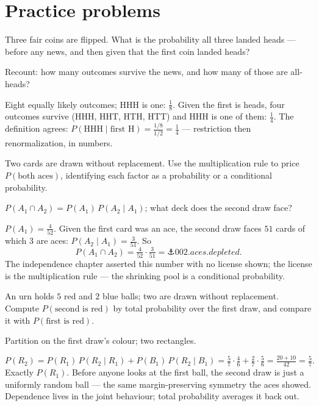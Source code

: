 \section*{Practice problems}

\begin{problem}
Three fair coins are flipped. What is the probability all three landed
heads — before any news, and then given that the first coin landed
heads?
\begin{hint}
Recount: how many outcomes survive the news, and how many of those are
all-heads?
\end{hint}
\begin{solution}
Eight equally likely outcomes; HHH is one: $\tfrac18$. Given the first
is heads, four outcomes survive (HHH, HHT, HTH, HTT) and HHH is one of
them: $\tfrac14$. The definition agrees:
$P(\mathrm{HHH} \mid \text{first H}) = \tfrac{1/8}{1/2} = \tfrac14$ —
restriction then renormalization, in numbers.
\end{solution}
\end{problem}

\begin{problem}
Two cards are drawn without replacement. Use the multiplication rule to
price $P(\text{both aces})$, identifying each factor as a probability
or a conditional probability.
\begin{hint}
$P(A_1 \cap A_2) = P(A_1)\,P(A_2 \mid A_1)$; what deck does the second
draw face?
\end{hint}
\begin{solution}
$P(A_1) = \tfrac{4}{52}$. Given the first card was an ace, the second
draw faces $51$ cards of which $3$ are aces:
$P(A_2 \mid A_1) = \tfrac{3}{51}$. So
\[
  P(A_1 \cap A_2) = \tfrac{4}{52} \cdot \tfrac{3}{51}
  = \anchor{002.aces.depleted}.
\]
The independence chapter asserted this number with no license shown;
the license is the multiplication rule — the shrinking pool is a
conditional probability.
\end{solution}
\end{problem}

\begin{problem}
An urn holds $5$ red and $2$ blue balls; two are drawn without
replacement. Compute $P(\text{second is red})$ by total probability
over the first draw, and compare it with $P(\text{first is red})$.
\begin{hint}
Partition on the first draw's colour; two rectangles.
\end{hint}
\begin{solution}
\[
  P(R_2) = P(R_1)\,P(R_2 \mid R_1) + P(B_1)\,P(R_2 \mid B_1)
  = \tfrac57 \cdot \tfrac46 + \tfrac27 \cdot \tfrac56
  = \tfrac{20+10}{42} = \tfrac57 .
\]
Exactly $P(R_1)$. Before anyone looks at the first ball, the second
draw is just a uniformly random ball — the same margin-preserving
symmetry the aces showed. Dependence lives in the joint behaviour;
total probability averages it back out.
\end{solution}
\end{problem}

